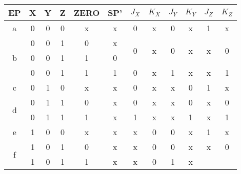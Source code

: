 

\begin{table}[H]
  \centering
  \begin{tabular}{c c c c c c c c c c c c}
    \toprule
    EP & X & Y & Z & ZERO & SP' & $J_X$ & $K_X$   & $J_Y$ & $K_Y$   & $J_Z$ & $K_Z$ \\
    \toprule
    a
       & 0 & 0 & 0 & x & x
       & 0 & x %
       & 0 & x %
       & 1 & x %
       \\
    \cmidrule(r){1-6}      \cmidrule(l){7-8} \cmidrule(l){9-10} \cmidrule(l){11-12}
    \multirow{3}{*}{b}
       & 0 & 0 & 1 & 0 & x
       & \multirow{2}{*}{0} & \multirow{2}{*}{x} %
       & \multirow{2}{*}{0} & \multirow{2}{*}{x} %
       & \multirow{2}{*}{x} & \multirow{2}{*}{0} %
       \\
       & 0 & 0 & 1 & 1 & 0 & & & & & &
       \\
    \cmidrule(r){2-6}      \cmidrule(l){7-8} \cmidrule(l){9-10} \cmidrule(l){11-12}
       & 0 & 0 & 1 & 1 & 1
       & 0 & x %
       & 1 & x %
       & x & 1 %
       \\
    \cmidrule(r){1-6}      \cmidrule(l){7-8} \cmidrule(l){9-10} \cmidrule(l){11-12}
    c
       & 0 & 1 & 0 & x & x
       & 0 & x %
       & x & 0 %
       & 1 & x %
       \\
    \cmidrule(r){1-6}      \cmidrule(l){7-8} \cmidrule(l){9-10} \cmidrule(l){11-12}
    \multirow{2}{*}{d}
       & 0 & 1 & 1 & 0 & x
       & 0 & x %
       & x & 0 %
       & x & 0 %
       \\
    \cmidrule(r){2-6}      \cmidrule(l){7-8} \cmidrule(l){9-10} \cmidrule(l){11-12}
       & 0 & 1 & 1 & 1 & x
       & 1 & x %
       & x & 1 %
       & x & 1 %
       \\
    \cmidrule(r){1-6}      \cmidrule(l){7-8} \cmidrule(l){9-10} \cmidrule(l){11-12}
    e
       & 1 & 0 & 0 & x & x
       & x & 0 %
       & 0 & x %
       & 1 & x %
       \\
    \cmidrule(r){1-6}      \cmidrule(l){7-8} \cmidrule(l){9-10} \cmidrule(l){11-12}
    \multirow{2}{*}{f}
       & 1 & 0 & 1 & 0 & x
       & x & 0 %
       & 0 & x %
       & x & 0 %
       \\
    \cmidrule(r){2-6}      \cmidrule(l){7-8} \cmidrule(l){9-10} \cmidrule(l){11-12}
       & 1 & 0 & 1 & 1 & x
       & x & 0 %
       & 1 & x %

\end{tabular}
\end{table}
